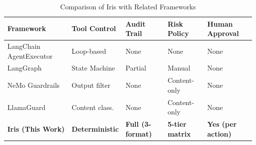 \begin{table}[H]
\centering
\caption{Comparison of Iris with Related Frameworks}
\begin{tabularx}{\textwidth}{lXXXX}
\toprule
\textbf{Framework} & \textbf{Tool Control} & \textbf{Audit Trail} & \textbf{Risk Policy} & \textbf{Human Approval} \\
\midrule
LangChain AgentExecutor & Loop-based & None & None & None \\
LangGraph & State Machine & Partial & Manual & None \\
NeMo Guardrails & Output filter & None & Content-only & None \\
LlamaGuard & Content class. & None & Content-only & None \\
\rowcolor{lightblue}
\textbf{Iris (This Work)} & \textbf{Deterministic} & \textbf{Full (3-format)} & \textbf{5-tier matrix} & \textbf{Yes (per action)} \\
\bottomrule
\end{tabularx}
\end{table}
